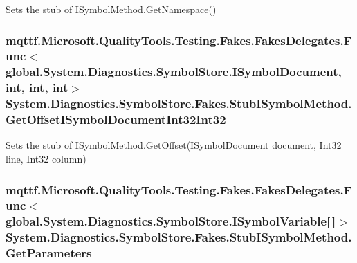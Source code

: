 Sets the stub of I\-Symbol\-Method.\-Get\-Namespace()

\hypertarget{class_system_1_1_diagnostics_1_1_symbol_store_1_1_fakes_1_1_stub_i_symbol_method_a604e4d5f2204d65e4f9f82fb4f4595e2}{
\subsubsection[{Get\-Offset\-I\-Symbol\-Document\-Int32\-Int32}]{\setlength{\rightskip}{0pt plus 5cm}mqttf.\-Microsoft.\-Quality\-Tools.\-Testing.\-Fakes.\-Fakes\-Delegates.\-Func$<$global.\-System.\-Diagnostics.\-Symbol\-Store.\-I\-Symbol\-Document, int, int, int$>$ System.\-Diagnostics.\-Symbol\-Store.\-Fakes.\-Stub\-I\-Symbol\-Method.\-Get\-Offset\-I\-Symbol\-Document\-Int32\-Int32}}\label{class_system_1_1_diagnostics_1_1_symbol_store_1_1_fakes_1_1_stub_i_symbol_method_a604e4d5f2204d65e4f9f82fb4f4595e2}


Sets the stub of I\-Symbol\-Method.\-Get\-Offset(\-I\-Symbol\-Document document, Int32 line, Int32 column)

\hypertarget{class_system_1_1_diagnostics_1_1_symbol_store_1_1_fakes_1_1_stub_i_symbol_method_a56970218c2564e1c4d81ed5857138d8f}{
\subsubsection[{Get\-Parameters}]{\setlength{\rightskip}{0pt plus 5cm}mqttf.\-Microsoft.\-Quality\-Tools.\-Testing.\-Fakes.\-Fakes\-Delegates.\-Func$<$global.\-System.\-Diagnostics.\-Symbol\-Store.\-I\-Symbol\-Variable\mbox{[}$\,$\mbox{]}$>$ System.\-Diagnostics.\-Symbol\-Store.\-Fakes.\-Stub\-I\-Symbol\-Method.\-Get\-Parameters}}\label{class_system_1_1_diagnostics_1_1_symbol_store_1_1_fakes_1_1_stub_i_symbol_method_a56970218c2564e1c4d81ed5857138d8f}


